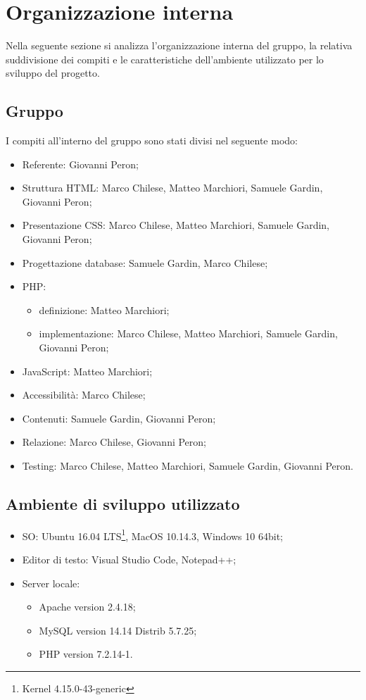 \section{Organizzazione interna}
Nella seguente sezione si analizza l'organizzazione interna del gruppo, la relativa suddivisione dei compiti e le caratteristiche dell'ambiente utilizzato per lo sviluppo del progetto.
\subsection{Gruppo}
I compiti all'interno del gruppo sono stati divisi nel seguente modo:
\begin{itemize}
\item Referente: Giovanni Peron;
\item Struttura HTML: Marco Chilese, Matteo Marchiori, Samuele Gardin, Giovanni Peron;
\item Presentazione CSS: Marco Chilese, Matteo Marchiori, Samuele Gardin, Giovanni Peron;
\item Progettazione database: Samuele Gardin, Marco Chilese;
\item PHP: 
\begin{itemize}
	\item definizione: Matteo Marchiori;
	\item implementazione: Marco Chilese, Matteo Marchiori, Samuele Gardin, Giovanni Peron;
\end{itemize}
\item JavaScript: Matteo Marchiori;
\item Accessibilità: Marco Chilese;
\item Contenuti: Samuele Gardin, Giovanni Peron;
\item Relazione: Marco Chilese, Giovanni Peron;
\item Testing: Marco Chilese, Matteo Marchiori, Samuele Gardin, Giovanni Peron.
\end{itemize}
\newpage
\subsection{Ambiente di sviluppo utilizzato}
\begin{itemize}
	\item SO: Ubuntu 16.04 LTS\footnote{Kernel 4.15.0-43-generic}, MacOS 10.14.3, Windows 10 64bit;
	\item Editor di testo: Visual Studio Code, Notepad++;
	\item Server locale:
		\begin{itemize}
			\item Apache version 2.4.18;
			\item MySQL version 14.14 Distrib 5.7.25;
			\item PHP version 7.2.14-1.
		\end{itemize} 
\end{itemize}

